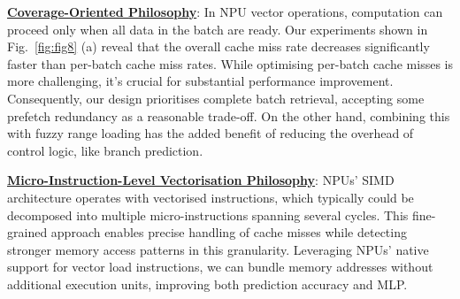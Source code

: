 \noindent \textbf{\underline{Coverage-Oriented Philosophy}}:
In NPU vector operations, computation can proceed only when all data in the batch are ready. 
Our experiments shown in Fig.~\ref{fig:fig8} (a) reveal that the overall cache miss rate decreases significantly faster than per-batch cache miss rates. 
While optimising per-batch cache misses is more challenging, it's crucial for substantial performance improvement.
Consequently, our design prioritises complete batch retrieval, accepting some prefetch redundancy as a reasonable trade-off. 
On the other hand, combining this with fuzzy range loading has the added benefit of reducing the overhead of control logic, like branch prediction. 



\noindent \textbf{\underline{Micro-Instruction-Level Vectorisation Philosophy}}:
NPUs' SIMD architecture operates with vectorised instructions, which typically could be decomposed into multiple micro-instructions spanning several cycles.
This fine-grained approach enables precise handling of cache misses while detecting stronger memory access patterns in this granularity.
Leveraging NPUs' native support for vector load instructions, we can bundle memory addresses without additional execution units, improving both prediction accuracy and MLP. 








